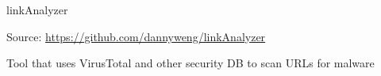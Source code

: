 
\begin{cventries}
  \cventry
    {} %
    {linkAnalyzer} %
    {} %
    {} %
    {
      \begin{cvitems} %
        \item {Source: \url{https://github.com/dannyweng/linkAnalyzer}}
		    \item {Tool that uses VirusTotal and other security DB to scan URLs for malware}
      \end{cvitems}
    }


\end{cventries}
